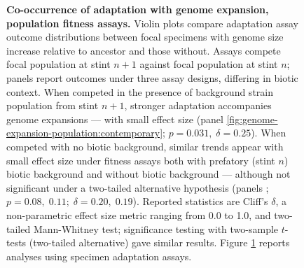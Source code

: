 \begin{figure}
\caption{
    \textbf{Co-occurrence of adaptation with genome expansion, population fitness assays.}
    \footnotesize
    Violin plots compare adaptation assay outcome distributions between focal specimens with genome size increase relative to ancestor and those without.
    Assays compete focal population at stint $n+1$ against focal population at stint $n$;
    panels report outcomes under three assay designs, differing in biotic context.
    When competed in the presence of background strain population from stint $n+1$, stronger adaptation accompanies genome expansions --- with small effect size (panel \ref{fig:genome-expansion-population:contemporary}; $p = 0.031, \; \delta = 0.25$).
    When competed with no biotic background, similar trends appear with small effect size under fitness assays both with prefatory (stint $n$) biotic background and without biotic background --- although not significant under a two-tailed alternative hypothesis (panels ; $p=0.08,\; 0.11; \; \delta = 0.20, \; 0.19$).
    Reported statistics are Cliff's $\delta$, a non-parametric effect size metric ranging from 0.0 to 1.0, and two-tailed Mann-Whitney test; significance testing with two-sample $t$-tests (two-tailed alternative) gave similar results.
    Figure \ref{fig:genome-expansion-population} reports analyses using specimen adaptation assays.
}
\label{fig:genome-expansion-population}

\end{figure}
